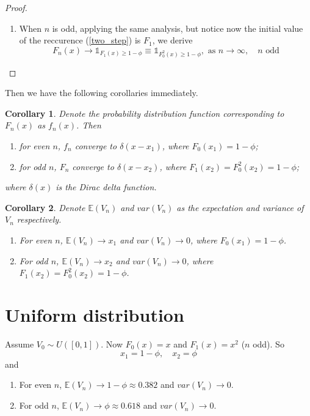 \documentclass{article}
\newtheorem{col}{Corollary}[section]
\begin{document}
\begin{spacing}{1.4}
\begin{proof}
\begin{enumerate}
    \item When $n$ is odd, applying the same analysis, but notice now the initial value of the reccurence (\ref{two_step}) is $F_1$, we derive
    \begin{equation}
      F_n(x) \to \mathds{1}_{F_1(x) \geq 1 - \phi} \equiv \mathds{1}_{F_0^2(x) \geq 1 - \phi}, \text{ as } n \to \infty, \quad \text{$n$ odd}
    \end{equation}

  \end{enumerate}
\end{proof}

Then we have the following corollaries immediately.
\begin{col}
  Denote the probability distribution function corresponding to $F_n(x)$ as $f_n(x)$. Then
  \begin{enumerate}
    \item for even $n$, $f_n$ converge to $\delta(x - x_1)$, where $F_0(x_1) = 1 - \phi$;
    \item for odd $n$, $F_n$ converge to $\delta(x - x_2)$, where $F_1(x_2) = F_0^2(x_2) = 1 - \phi$;
  \end{enumerate}
  where $\delta(x)$ is the Dirac delta function.
\end{col}

\begin{col} Denote $\mathbb{E} (V_n)$ and $var(V_n)$ as the expectation and variance of $V_n$ respectively.
  \begin{enumerate}
    \item For even $n$, $\mathbb{E} (V_n) \to x_1$ and $var(V_n) \to 0$, where $F_0(x_1) = 1 - \phi$.
    \item For odd $n$, $\mathbb{E} (V_n) \to x_2$ and $var(V_n) \to 0$, where $F_1(x_2) = F_0^2(x_2) = 1 - \phi$.
  \end{enumerate}
\end{col}

\section{Uniform distribution}
Assume $V_0 \sim U([0, 1])$. Now $F_0(x) = x$ and $F_1(x) = x^2$ ($n$ odd). So
\begin{equation}
  x_1 = 1 - \phi, \quad x_2 = \phi
\end{equation}
and
\begin{enumerate}
  \item For even $n$, $\mathbb{E} (V_n) \to 1 - \phi \approx 0.382$ and $var(V_n) \to 0$.
  \item For odd $n$, $\mathbb{E} (V_n) \to \phi \approx 0.618$ and $var(V_n) \to 0$.
\end{enumerate}

\end{spacing}
\end{document}

